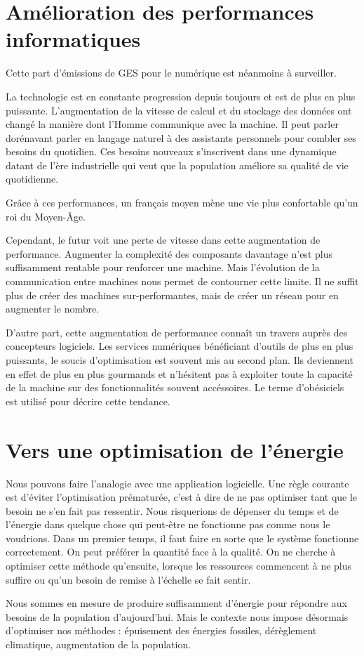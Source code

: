 \section{Amélioration des performances informatiques}

Cette part d'émissions de GES pour le numérique est néanmoins à surveiller.

La technologie est en constante progression depuis toujours et est de plus en plus puissante.
L'augmentation de la vitesse de calcul et du stockage des données ont changé la manière dont l'Homme communique avec la machine.
Il peut parler dorénavant parler en langage naturel à des assistants personnels pour combler ses besoins du quotidien.
Ces besoins nouveaux s'inscrivent dans une dynamique datant de l'ère industrielle qui veut que
la population améliore sa qualité de vie quotidienne.

Grâce à ces performances, un français moyen mène une vie plus confortable qu'un roi du Moyen-Âge.

Cependant, le futur voit une perte de vitesse dans cette augmentation de performance.
Augmenter la complexité des composants davantage n'est plus suffisamment rentable pour renforcer une machine.
Mais l'évolution de la communication entre machines nous permet de contourner cette limite.
Il ne suffit plus de créer des machines sur-performantes, mais de créer un
réseau pour en augmenter le nombre.


D'autre part, cette augmentation de performance connaît un travers auprès des concepteurs logiciels.
Les services numériques bénéficiant d'outils de plus en plus puissants, le soucis d'optimisation est souvent mis au second plan.
Ils deviennent en effet de plus en plus gourmands et n'hésitent pas à exploiter toute la capacité de la machine sur des fonctionnalités souvent accéssoires.
Le terme d'obésiciels est utilisé pour décrire cette tendance.

\section{Vers une optimisation de l'énergie}

Nous pouvons faire l’analogie avec une application logicielle. Une règle courante est d’éviter
l’optimisation prématurée, c’est à dire de ne pas optimiser tant que le besoin ne s’en fait pas
ressentir. Nous risquerions de dépenser du temps et de l'énergie dans quelque chose qui
peut-être ne fonctionne pas comme nous le voudrions.
Dans un premier temps, il faut faire en sorte que le système fonctionne correctement.
On peut préférer la quantité face à la qualité. On ne cherche à optimiser cette méthode
qu’ensuite, lorsque les ressources commencent à ne plus suffire ou qu’un besoin de remise
à l’échelle se fait sentir.

Nous sommes en mesure de produire suffisamment d’énergie pour répondre aux
besoins de la population d'aujourd'hui. Mais le contexte nous impose désormais d’optimiser
nos méthodes : épuisement des énergies fossiles, dérèglement climatique, augmentation de la
population.




